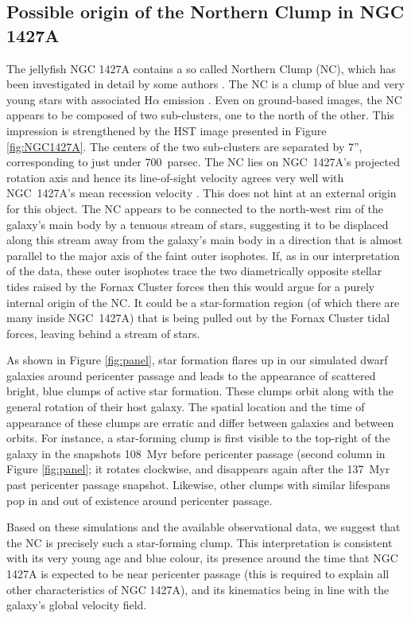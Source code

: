 \subsection{Possible origin of the Northern Clump in NGC 1427A} \label{NC1427A}
The jellyfish NGC 1427A contains a so called Northern Clump (NC), which has been investigated in detail by some authors \citep{Cellone1997, Hilker1997}.
The NC is a clump of blue and very young stars with associated H$\alpha$ emission \citep{Sivanandam2014}. Even on ground-based images, the NC appears to be composed of two sub-clusters, one to the north of the other. This impression is strengthened by the HST image presented in Figure \ref{fig:NGC1427A}. The centers of the two sub-clusters are separated by 7'', corresponding to just under 700~parsec. The NC lies on NGC~1427A's projected rotation axis and hence its line-of-sight velocity agrees very well with NGC~1427A's mean recession velocity \citep{Bureau1996,Chaname2000}. This does not hint at an external origin for this object. The NC appears to be connected to the north-west rim of the galaxy's main body by a tenuous stream of stars, suggesting it to be displaced along this stream away from the galaxy's main body in a direction that is almost parallel to the major axis of the faint outer isophotes. If, as in our interpretation of the data, these outer isophotes trace the two diametrically opposite stellar tides raised by the Fornax Cluster forces then this would argue for a purely internal origin of the NC. It could be a star-formation region (of which there are many inside NGC~1427A) that is being pulled out by the Fornax Cluster tidal forces, leaving behind a stream of stars.

As shown in Figure \ref{fig:panel}, star formation flares up in our simulated dwarf galaxies around pericenter passage and leads to the appearance of scattered bright, blue clumps of active star formation. These clumps orbit along with the general rotation of their host galaxy. The spatial location and the time of appearance of these clumps are erratic and differ between galaxies and between orbits.
For instance, a star-forming clump is first visible to the top-right of the galaxy in the snapshots 108~Myr before pericenter passage (second column in Figure \ref{fig:panel}; it rotates clockwise, and disappears again after the 137~Myr past pericenter passage snapshot. Likewise, other clumps with similar lifespans pop in and out of existence around pericenter passage. 

Based on these simulations and the available observational data, we suggest that the NC is precisely such a star-forming clump. This interpretation is consistent with its very young age and blue colour, its presence around the time that NGC 1427A is expected to be near pericenter passage (this is required to explain all other characteristics of NGC 1427A), and its kinematics being in line with the galaxy's global velocity field.


